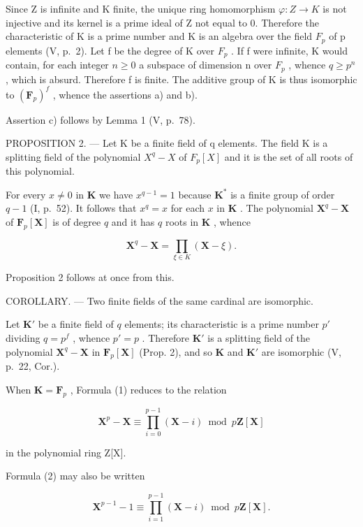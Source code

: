 Since Z is infinite and K finite, the unique ring homomorphism \(\varphi:Z\to K\) is not injective and its kernel is a prime ideal of Z not equal to 0. Therefore the characteristic of K is a prime number and K is an algebra over the field \(F_{p}\) of p elements (V, p.~2). Let f be the degree of K over \(F_{p}\) . If f were infinite, K would contain, for each integer \(n\geqslant0\) a subspace of dimension n over \(F_{p}\) , whence \(q\geqslant p^{n}\) , which is absurd. Therefore f is finite. The additive group of K is thus isomorphic to \((\mathbf{F}_{p})^{f}\) , whence the assertions a) and b).

Assertion c) follows by Lemma 1 (V, p.~78).

PROPOSITION 2. --- Let K be a finite field of q elements. The field K is a splitting field of the polynomial \(X^{q}-X\) of \(F_{p}[X]\) and it is the set of all roots of this polynomial.

For every \(x \neq 0\) in \(\mathbf{K}\) we have \(x^{q-1} = 1\) because \(\mathbf{K}^*\) is a finite group of order \(q - 1\) (I, p.~52). It follows that \(x^q = x\) for each \(x\) in \(\mathbf{K}\) . The polynomial \(\mathbf{X}^q - \mathbf{X}\) of \(\mathbf{F}_p[\mathbf{X}]\) is of degree \(q\) and it has \(q\) roots in \(\mathbf{K}\) , whence

\[
\mathbf {X} ^ {q} - \mathbf {X} = \prod_ {\xi \in K} (\mathbf {X} - \xi).\tag{1}
\]

Proposition 2 follows at once from this.

COROLLARY. --- Two finite fields of the same cardinal are isomorphic.

Let \(\mathbf{K}'\) be a finite field of \(q\) elements; its characteristic is a prime number \(p'\) dividing \(q = p^f\) , whence \(p' = p\) . Therefore \(\mathbf{K}'\) is a splitting field of the polynomial \(\mathbf{X}^q - \mathbf{X}\) in \(\mathbf{F}_p[\mathbf{X}]\) (Prop. 2), and so \(\mathbf{K}\) and \(\mathbf{K}'\) are isomorphic (V, p.~22, Cor.).

When \(\mathbf{K} = \mathbf{F}_p\) , Formula (1) reduces to the relation

\[
\mathbf {X} ^ {p} - \mathbf {X} \equiv \prod_ {i = 0} ^ {p - 1} (\mathbf {X} - i) \bmod p \mathbf {Z} [ \mathbf {X} ]\tag{2}
\]

in the polynomial ring Z{[}X{]}.

Formula (2) may also be written

\[
\mathbf {X} ^ {p - 1} - 1 \equiv \prod_ {i = 1} ^ {p - 1} (\mathbf {X} - i) \bmod p \mathbf {Z} [ \mathbf {X} ].\tag{3}
\]

